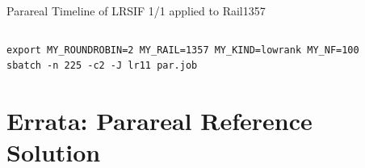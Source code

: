 \begin{frame}[b,fragile,label=rail1357]{Parareal Timeline of LRSIF 1/1 applied to Rail1357}
\begin{columns}[T]
  \end{columns}
  \vfill
  \begin{lstlisting}
export MY_ROUNDROBIN=2 MY_RAIL=1357 MY_KIND=lowrank MY_NF=100
sbatch -n 225 -c2 -J lr11 par.job
  \end{lstlisting}
\end{frame}

\section{Errata: Parareal Reference Solution}

